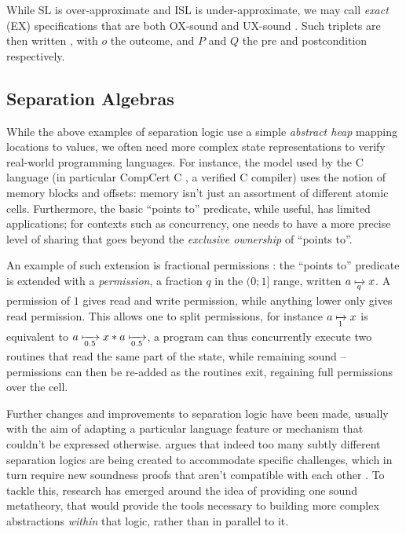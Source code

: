 While SL is over-approximate and ISL is under-approximate, we may call \emph{exact} (EX) specifications that are both OX-sound and UX-sound \cite{exactsl}. Such triplets are then written , with $o$ the outcome, and $P$ and $Q$ the pre and postcondition respectively.

\subsection{Separation Algebras}
\label{subsec:separation-algebras}

While the above examples of separation logic use a simple \emph{abstract heap} mapping locations to values, we often need more complex state representations to verify real-world programming languages. For instance, the model used by the C language (in particular CompCert C \cite{compcert}, a verified C compiler) uses the notion of memory blocks and offsets: memory isn't just an assortment of different atomic cells. Furthermore, the basic ``points to'' predicate, while useful, has limited applications; for contexts such as concurrency, one needs to have a more precise level of sharing that goes beyond the \emph{exclusive ownership} of ``points to''.

An example of such extension is fractional permissions \cite{fracpermissions, fracpermissions2}: the ``points to'' predicate is extended with a \emph{permission}, a fraction $q$ in the $(0;1]$ range, written $a \mapstoq{q} x$. A permission of $1$ gives read and write permission, while anything lower only gives read permission. This allows one to split permissions, for instance $a \mapstoq{1} x$ is equivalent to $a\mapstoq{0.5}x * a\mapstoq{0.5}$, a program can thus concurrently execute two routines that read the same part of the state, while remaining sound -- permissions can then be re-added as the routines exit, regaining full permissions over the cell.

Further changes and improvements to separation logic have been made, usually with the aim of adapting a particular language feature or mechanism that couldn't be expressed otherwise.  \cite{next700seplogics} argues that indeed too many subtly different separation logics are being created to accommodate specific challenges, which in turn require new soundness proofs that aren't compatible with each other \cite{sljungle}. To tackle this, research has emerged around the idea of providing one sound metatheory, that would provide the tools necessary to building more complex abstractions \emph{within} that logic, rather than in parallel to it.

